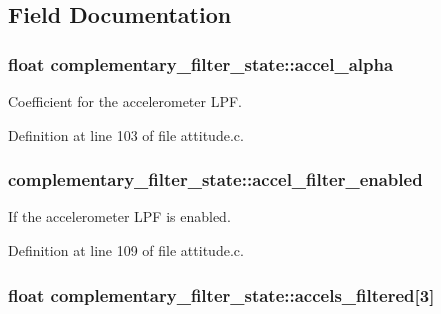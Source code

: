 \subsection{Field Documentation}
\hypertarget{structcomplementary__filter__state_a2a0dfc57428cafd19006fe7cd1dee0ce}{
\subsubsection[{accel\-\_\-alpha}]{\setlength{\rightskip}{0pt plus 5cm}float complementary\-\_\-filter\-\_\-state\-::accel\-\_\-alpha}}\label{structcomplementary__filter__state_a2a0dfc57428cafd19006fe7cd1dee0ce}


Coefficient for the accelerometer L\-P\-F. 



Definition at line 103 of file attitude.\-c.

\hypertarget{structcomplementary__filter__state_a7d259f4954fc2a3ed14353faa41f6414}{
\subsubsection[{accel\-\_\-filter\-\_\-enabled}]{ complementary\-\_\-filter\-\_\-state\-::accel\-\_\-filter\-\_\-enabled}}\label{structcomplementary__filter__state_a7d259f4954fc2a3ed14353faa41f6414}


If the accelerometer L\-P\-F is enabled. 



Definition at line 109 of file attitude.\-c.

\hypertarget{structcomplementary__filter__state_a88a370dd8e3f412f189e5a585b9d1a52}{
\subsubsection[{accels\-\_\-filtered}]{\setlength{\rightskip}{0pt plus 5cm}float complementary\-\_\-filter\-\_\-state\-::accels\-\_\-filtered\mbox{[}3\mbox{]}}}\label{structcomplementary__filter__state_a88a370dd8e3f412f189e5a585b9d1a52}


